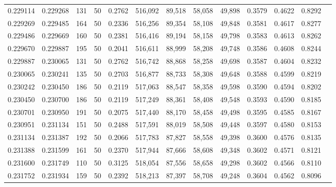 \begin{tabular}{rrrrrrrrrrrrr}
0.229114 & 0.229268 &   131 &  50 &                                     0.2762 & 516,092 &  89,518 &  58,058 &  49,898 & 0.3579 & 0.4622 & 0.8292 \\
0.229269 & 0.229485 &   164 &  50 &                                     0.2336 & 516,256 &  89,354 &  58,108 &  49,848 & 0.3581 & 0.4617 & 0.8277 \\
0.229486 & 0.229669 &   160 &  50 &                                     0.2381 & 516,416 &  89,194 &  58,158 &  49,798 & 0.3583 & 0.4613 & 0.8262 \\
0.229670 & 0.229887 &   195 &  50 &                                     0.2041 & 516,611 &  88,999 &  58,208 &  49,748 & 0.3586 & 0.4608 & 0.8244 \\
0.229887 & 0.230065 &   131 &  50 &                                     0.2762 & 516,742 &  88,868 &  58,258 &  49,698 & 0.3587 & 0.4604 & 0.8232 \\
0.230065 & 0.230241 &   135 &  50 &                                     0.2703 & 516,877 &  88,733 &  58,308 &  49,648 & 0.3588 & 0.4599 & 0.8219 \\
0.230242 & 0.230450 &   186 &  50 &                                     0.2119 & 517,063 &  88,547 &  58,358 &  49,598 & 0.3590 & 0.4594 & 0.8202 \\
0.230450 & 0.230700 &   186 &  50 &                                     0.2119 & 517,249 &  88,361 &  58,408 &  49,548 & 0.3593 & 0.4590 & 0.8185 \\
0.230701 & 0.230950 &   191 &  50 &                                     0.2075 & 517,440 &  88,170 &  58,458 &  49,498 & 0.3595 & 0.4585 & 0.8167 \\
0.230951 & 0.231134 &   151 &  50 &                                     0.2488 & 517,591 &  88,019 &  58,508 &  49,448 & 0.3597 & 0.4580 & 0.8153 \\
0.231134 & 0.231387 &   192 &  50 &                                     0.2066 & 517,783 &  87,827 &  58,558 &  49,398 & 0.3600 & 0.4576 & 0.8135 \\
0.231388 & 0.231599 &   161 &  50 &                                     0.2370 & 517,944 &  87,666 &  58,608 &  49,348 & 0.3602 & 0.4571 & 0.8121 \\
0.231600 & 0.231749 &   110 &  50 &                                     0.3125 & 518,054 &  87,556 &  58,658 &  49,298 & 0.3602 & 0.4566 & 0.8110 \\
0.231752 & 0.231934 &   159 &  50 &                                     0.2392 & 518,213 &  87,397 &  58,708 &  49,248 & 0.3604 & 0.4562 & 0.8096 \\

\end{tabular}
